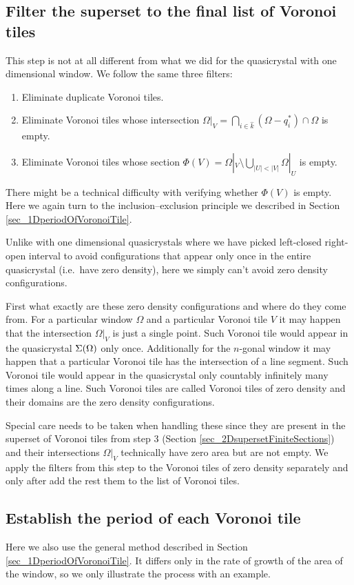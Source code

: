 \documentclass[text.tex]{subfiles}
\begin{document}
\subsection{Filter the superset to the final list of Voronoi tiles}
This step is not at all different from what we did for the quasicrystal with one dimensional window. We follow the same three filters: 
\begin{enumerate}
\item Eliminate duplicate Voronoi tiles. 
\item Eliminate Voronoi tiles whose intersection $\Omega|_{V} = \bigcap\limits_{i\in\hat{k}}(\Omega-q_i^\ast)\cap\Omega$ is empty. 
\item Eliminate Voronoi tiles whose section $\Phi(V) = \Omega|_{V}\setminus\bigcup_{|U|<|V|}\Omega|_{U}$ is empty. 
\end{enumerate}

There might be a technical difficulty with verifying whether $\Phi(V)$ is empty. Here we again turn to the inclusion--exclusion principle we described in Section \ref{sec_1DperiodOfVoronoiTile}. 

Unlike with one dimensional quasicrystals where we have picked left-closed right-open interval to avoid configurations that appear only once in the entire quasicrystal (i.e.\ have zero density), here we simply can't avoid zero density configurations. 

First what exactly are these zero density configurations and where do they come from. For a particular window $\Omega$ and a particular Voronoi tile $V$ it may happen that the intersection $\Omega|_V$ is just a single point. Such Voronoi tile would appear in the quasicrystal $\Sigma(\Omega)$ only once. Additionally for the $n$-gonal window it may happen that a particular Voronoi tile has the intersection of a line segment. Such Voronoi tile would appear in the quasicrystal only countably infinitely many times along a line. Such Voronoi tiles are called Voronoi tiles of zero density and their domains are the zero density configurations. 

Special care needs to be taken when handling these since they are present in the superset of Voronoi tiles from step 3 (Section \ref{sec_2DsupersetFiniteSections}) and their intersections $\Omega|_V$ technically have zero area but are not empty. We apply the filters from this step to the Voronoi tiles of zero density separately and only after add the rest them to the list of Voronoi tiles. 

\subsection{Establish the period of each Voronoi tile}
Here we also use the general method described in Section \ref{sec_1DperiodOfVoronoiTile}. It differs only in the rate of growth of the area of the window, so we only illustrate the process with an example. 
\end{document}
